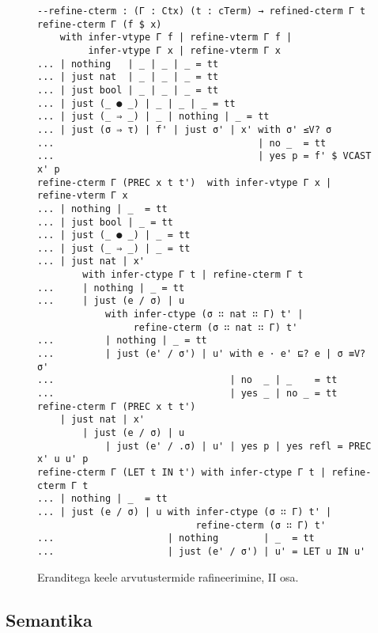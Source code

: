 \documentclass[a4paper,12pt]{article}
\begin{document}
\begin{figure}
  \begin{BVerbatim}
--refine-cterm : (Γ : Ctx) (t : cTerm) → refined-cterm Γ t
refine-cterm Γ (f $ x)
    with infer-vtype Γ f | refine-vterm Γ f |
         infer-vtype Γ x | refine-vterm Γ x
... | nothing   | _ | _ | _ = tt
... | just nat  | _ | _ | _ = tt
... | just bool | _ | _ | _ = tt
... | just (_ ● _) | _ | _ | _ = tt
... | just (_ ⇒ _) | _ | nothing | _ = tt  
... | just (σ ⇒ τ) | f' | just σ' | x' with σ' ≤V? σ
...                                    | no _  = tt
...                                    | yes p = f' $ VCAST x' p
refine-cterm Γ (PREC x t t')  with infer-vtype Γ x | refine-vterm Γ x
... | nothing | _  = tt
... | just bool | _ = tt
... | just (_ ● _) | _ = tt
... | just (_ ⇒ _) | _ = tt
... | just nat | x'
        with infer-ctype Γ t | refine-cterm Γ t 
...     | nothing | _ = tt
...     | just (e / σ) | u
            with infer-ctype (σ ∷ nat ∷ Γ) t' |
                 refine-cterm (σ ∷ nat ∷ Γ) t'
...         | nothing | _ = tt
...         | just (e' / σ') | u' with e · e' ⊑? e | σ ≡V? σ'
...                               | no  _ | _    = tt
...                               | yes _ | no _ = tt
refine-cterm Γ (PREC x t t')
    | just nat | x'
        | just (e / σ) | u
            | just (e' / .σ) | u' | yes p | yes refl = PREC x' u u' p
refine-cterm Γ (LET t IN t') with infer-ctype Γ t | refine-cterm Γ t 
... | nothing | _  = tt
... | just (e / σ) | u with infer-ctype (σ ∷ Γ) t' |
                            refine-cterm (σ ∷ Γ) t'
...                    | nothing        | _  = tt
...                    | just (e' / σ') | u' = LET u IN u'
  \end{BVerbatim}
  \caption{Eranditega keele arvutustermide rafineerimine, II osa.}
  \label{fig:exc.refine-cterm2}
\end{figure}

\subsection{Semantika}\label{ssec:exc.semantics}
\end{document}
